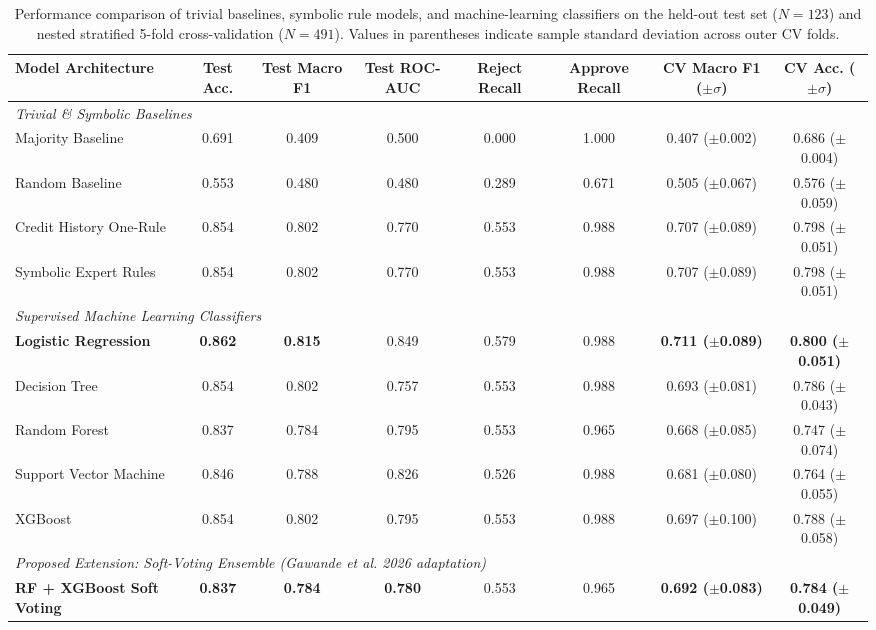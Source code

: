 \documentclass{COMPXXXX}
\begin{document}
\begin{table}[t]
\centering
\caption{Performance comparison of trivial baselines, symbolic rule models, and machine-learning classifiers on the held-out test set ($N=123$) and nested stratified 5-fold cross-validation ($N=491$). Values in parentheses indicate sample standard deviation across outer CV folds.}
\label{tab:results}
\small
\begin{tabular}{lccccccc}
\toprule
\textbf{Model Architecture} & \textbf{Test Acc.} & \textbf{Test Macro F1} & \textbf{Test ROC-AUC} & \textbf{Reject Recall} & \textbf{Approve Recall} & \textbf{CV Macro F1 ($\pm \sigma$)} & \textbf{CV Acc. ($\pm \sigma$)} \\
\midrule
\multicolumn{8}{l}{\textit{Trivial \& Symbolic Baselines}} \\
Majority Baseline & 0.691 & 0.409 & 0.500 & 0.000 & 1.000 & 0.407 ($\pm$0.002) & 0.686 ($\pm$0.004) \\
Random Baseline & 0.553 & 0.480 & 0.480 & 0.289 & 0.671 & 0.505 ($\pm$0.067) & 0.576 ($\pm$0.059) \\
Credit History One-Rule & 0.854 & 0.802 & 0.770 & 0.553 & 0.988 & 0.707 ($\pm$0.089) & 0.798 ($\pm$0.051) \\
Symbolic Expert Rules & 0.854 & 0.802 & 0.770 & 0.553 & 0.988 & 0.707 ($\pm$0.089) & 0.798 ($\pm$0.051) \\
\midrule
\multicolumn{8}{l}{\textit{Supervised Machine Learning Classifiers}} \\
\textbf{Logistic Regression} & \textbf{0.862} & \textbf{0.815} & 0.849 & 0.579 & 0.988 & \textbf{0.711 ($\pm$0.089)} & \textbf{0.800 ($\pm$0.051)} \\
Decision Tree & 0.854 & 0.802 & 0.757 & 0.553 & 0.988 & 0.693 ($\pm$0.081) & 0.786 ($\pm$0.043) \\
Random Forest & 0.837 & 0.784 & 0.795 & 0.553 & 0.965 & 0.668 ($\pm$0.085) & 0.747 ($\pm$0.074) \\
Support Vector Machine & 0.846 & 0.788 & 0.826 & 0.526 & 0.988 & 0.681 ($\pm$0.080) & 0.764 ($\pm$0.055) \\
XGBoost & 0.854 & 0.802 & 0.795 & 0.553 & 0.988 & 0.697 ($\pm$0.100) & 0.788 ($\pm$0.058) \\
\midrule
\multicolumn{8}{l}{\textit{Proposed Extension: Soft-Voting Ensemble (Gawande et al. 2026 adaptation)}} \\
\textbf{RF + XGBoost Soft Voting} & \textbf{0.837} & \textbf{0.784} & \textbf{0.780} & 0.553 & 0.965 & \textbf{0.692 ($\pm$0.083)} & \textbf{0.784 ($\pm$0.049)} \\
\bottomrule
\end{tabular}
\end{table}
\end{document}
